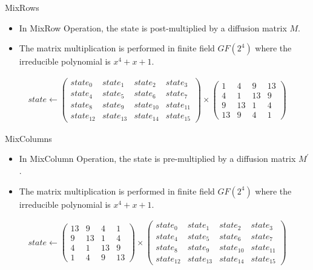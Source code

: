 \begin{frame}{MixRows}
    \begin{itemize}
        \item  In MixRow Operation, the state is post-multiplied by a diffusion matrix $M$. 
        \pause
        \item The matrix multiplication is performed in finite field $GF(2^4)$ where the irreducible polynomial is $x^4 + x+ 1$.
    \end{itemize}
    \begin{align*}
    state \leftarrow 
    \begin{pmatrix}
    state_0 & state_1 & state_2 & state_3 \\
    state_4 & state_5 & state_6 & state_7 \\
    state_8 & state_{9} & state_{10} & state_{11} \\
    state_{12} & state_{13} & state_{14} & state_{15}
    \end{pmatrix}
    \times
    \begin{pmatrix}
    1 & 4 & 9 & 13\\
    4 & 1 & 13 & 9\\
    9 & 13 & 1 & 4\\
    13 & 9 & 4 & 1
    \end{pmatrix}
    \end{align*}
\end{frame}

\begin{frame}{MixColumns}
    \begin{itemize}
        \item In MixColumn Operation, the state is pre-multiplied by a diffusion matrix $M^'$. 
        \pause
        \item The matrix multiplication is performed in finite field $GF(2^4)$ where the irreducible polynomial is $x^4 + x+ 1$.
    \end{itemize}
    \begin{align*}
    state \leftarrow 
    \begin{pmatrix}
    13 & 9 & 4 & 1\\
    9 & 13 & 1 & 4\\
    4 & 1 & 13 & 9\\
    1 & 4 & 9 & 13
    \end{pmatrix}
    \times
    \begin{pmatrix}
    state_0 & state_1 & state_2 & state_3 \\
    state_4 & state_5 & state_6 & state_7 \\
    state_8 & state_{9} & state_{10} & state_{11} \\
    state_{12} & state_{13} & state_{14} & state_{15}
    \end{pmatrix}
    \end{align*}
\end{frame}

